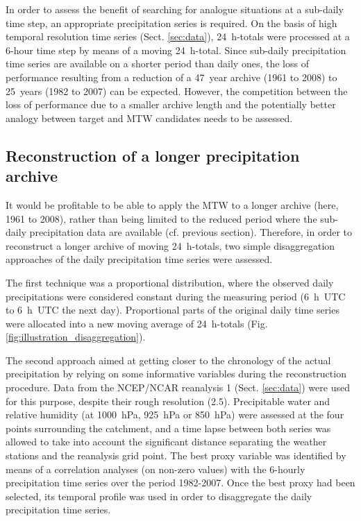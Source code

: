 \documentclass[hess, manuscript]{copernicus}
\begin{document}
	In order to assess the benefit of searching for analogue situations at a sub-daily time step, an appropriate precipitation series is required. On the basis of high temporal resolution time series (Sect. \ref{sec:data}), 24~h-totals were processed at a 6-hour time step by means of a moving 24~h-total. Since sub-daily precipitation time series are available on a shorter period than daily ones, the loss of performance resulting from a reduction of a 47~year archive (1961 to 2008) to 25~years (1982 to 2007) can be expected. However, the competition between the loss of performance due to a smaller archive length and the potentially better analogy between target and MTW candidates needs to be assessed.
	
	
	\subsection{Reconstruction of a longer precipitation archive}
	\label{sec:reconstruction}
	
	It would be profitable to be able to apply the MTW to a longer archive (here, 1961 to 2008), rather than being limited to the reduced period where the sub-daily precipitation data are available (cf. previous section). Therefore, in order to reconstruct a longer archive of moving 24~h-totals, two simple disaggregation approaches of the daily precipitation time series were assessed.
	
	The first technique was a proportional distribution, where the observed daily precipitations were considered constant during the measuring period (6~h~UTC to 6~h~UTC the next day). Proportional parts of the original daily time series were allocated into a new moving average of 24~h-totals (Fig. \ref{fig:illustration_disaggregation}). 
	
	The second approach aimed at getting closer to the chronology of the actual precipitation by relying on some informative variables during the reconstruction procedure. Data from the NCEP/NCAR reanalysis 1 (Sect. \ref{sec:data}) were used for this purpose, despite their rough resolution (2.5\degree). Precipitable water and relative humidity (at 1000~hPa, 925~hPa or 850~hPa) were assessed at the four points surrounding the catchment, and a time lapse between both series was allowed to take into account the significant distance separating the weather stations and the reanalysis grid point. The best proxy variable was identified by means of a correlation analyses (on non-zero values) with the 6-hourly precipitation time series over the period 1982-2007. Once the best proxy had been selected, its temporal profile was used in order to disaggregate the daily precipitation time series.
	
\end{document}
